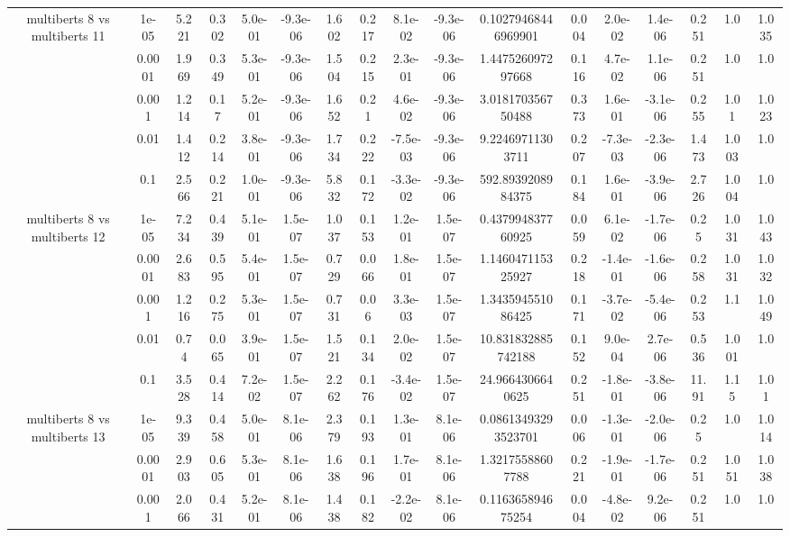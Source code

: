 \begin{tabular}{|c|c|c|c|c|c|c|c|c|c|c|c|c|c|c|c|c|}
\hline
\multirow{5}{*}{multiberts 8 vs multiberts 11} & 1e-05 & 5.221 & 0.302 & 5.0e-01 & -9.3e-06 & 1.602 & 0.217 & 8.1e-02 & -9.3e-06 & 0.10279468446969901 & 0.004 & 2.0e-02 & 1.4e-06 & 0.251 & 1.0 & 1.035 \\
 & 0.0001 & 1.969 & 0.349 & 5.3e-01 & -9.3e-06 & 1.504 & 0.215 & 2.3e-01 & -9.3e-06 & 1.447526097297668 & 0.116 & 4.7e-02 & 1.1e-06 & 0.251 & 1.0 & 1.0 \\
 & 0.001 & 1.214 & 0.17 & 5.2e-01 & -9.3e-06 & 1.652 & 0.21 & 4.6e-02 & -9.3e-06 & 3.018170356750488 & 0.373 & 1.6e-01 & -3.1e-06 & 0.255 & 1.01 & 1.023 \\
 & 0.01 & 1.412 & 0.214 & 3.8e-01 & -9.3e-06 & 1.734 & 0.222 & -7.5e-03 & -9.3e-06 & 9.22469711303711 & 0.207 & -7.3e-03 & -2.3e-06 & 1.473 & 1.003 & 1.0 \\
 & 0.1 & 2.566 & 0.221 & 1.0e-01 & -9.3e-06 & 5.832 & 0.172 & -3.3e-02 & -9.3e-06 & 592.8939208984375 & 0.184 & 1.6e-01 & -3.9e-06 & 2.726 & 1.004 & 1.0 \\
\hline
\multirow{5}{*}{multiberts 8 vs multiberts 12} & 1e-05 & 7.234 & 0.439 & 5.1e-01 & 1.5e-07 & 1.037 & 0.153 & 1.2e-01 & 1.5e-07 & 0.437994837760925 & 0.059 & 6.1e-02 & -1.7e-06 & 0.25 & 1.031 & 1.043 \\
 & 0.0001 & 2.683 & 0.595 & 5.4e-01 & 1.5e-07 & 0.729 & 0.066 & 1.8e-01 & 1.5e-07 & 1.146047115325927 & 0.218 & -1.4e-01 & -1.6e-06 & 0.258 & 1.031 & 1.032 \\
 & 0.001 & 1.216 & 0.275 & 5.3e-01 & 1.5e-07 & 0.731 & 0.06 & 3.3e-03 & 1.5e-07 & 1.343594551086425 & 0.171 & -3.7e-02 & -5.4e-06 & 0.253 & 1.1 & 1.049 \\
 & 0.01 & 0.74 & 0.065 & 3.9e-01 & 1.5e-07 & 1.521 & 0.134 & 2.0e-02 & 1.5e-07 & 10.831832885742188 & 0.152 & 9.0e-04 & 2.7e-06 & 0.536 & 1.001 & 1.0 \\
 & 0.1 & 3.528 & 0.414 & 7.2e-02 & 1.5e-07 & 2.262 & 0.176 & -3.4e-02 & 1.5e-07 & 24.9664306640625 & 0.251 & -1.8e-01 & -3.8e-06 & 11.91 & 1.15 & 1.01 \\
\hline
\multirow{5}{*}{multiberts 8 vs multiberts 13} & 1e-05 & 9.339 & 0.458 & 5.0e-01 & 8.1e-06 & 2.379 & 0.193 & 1.3e-01 & 8.1e-06 & 0.08613493293523701 & 0.006 & -1.3e-01 & -2.0e-06 & 0.25 & 1.0 & 1.014 \\
 & 0.0001 & 2.903 & 0.605 & 5.3e-01 & 8.1e-06 & 1.638 & 0.196 & 1.7e-01 & 8.1e-06 & 1.32175588607788 & 0.221 & -1.9e-01 & -1.7e-06 & 0.251 & 1.051 & 1.038 \\
 & 0.001 & 2.066 & 0.431 & 5.2e-01 & 8.1e-06 & 1.438 & 0.182 & -2.2e-02 & 8.1e-06 & 0.116365894675254 & 0.004 & -4.8e-02 & 9.2e-06 & 0.251 & 1.0 & 1.0 \\

\end{tabular}
